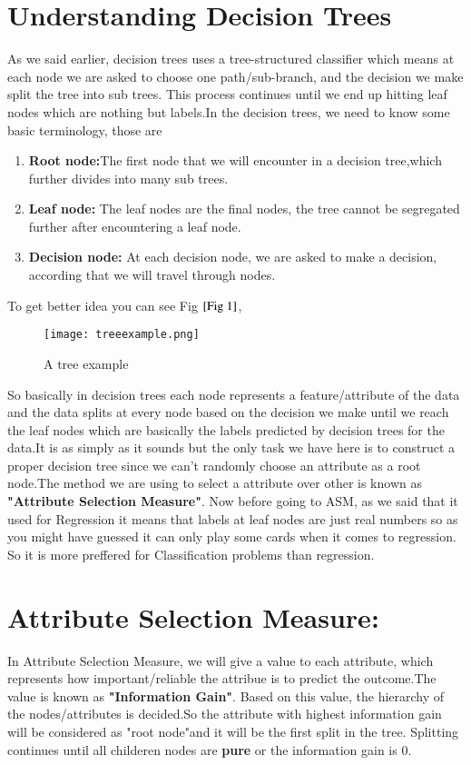 \documentclass[journal,12pt,onecolumn]{IEEEtran}
\theoremstyle{remark}
\numberwithin{equation}{section}
\begin{document}
                \section{Understanding Decision Trees}
                 As we said earlier, decision trees uses a tree-structured classifier which means at each node we are asked to choose one path/sub-branch, and the decision we make split the tree into sub trees. This process continues until we end up hitting leaf nodes which are nothing but labels.In the decision trees, we need to know some basic terminology, those are 
                \begin{enumerate}
                 \item \textbf{Root node:}The first node that we will encounter in a decision tree,which further divides into many sub trees.
                 \item \textbf{Leaf node:} The leaf nodes are the final nodes, the tree cannot be segregated further after encountering a leaf node.
                 \item \textbf{Decision node:} At each decision node, we are asked to make a decision, according that we will travel through nodes.    
                \end{enumerate}
     To get better idea you can see Fig $\ref{Fig 1}$,
           \begin{figure}
             \centering
             \texttt{[image: treeexample.png]}
             \caption{A tree example}
             \label{Fig 1}
           \end{figure}
     So basically in decision trees each node represents a feature/attribute of the data and the data splits at every node based on the decision we make until we reach the leaf nodes which are basically the labels predicted by decision trees for the data.It is as simply as it sounds but the only task we have here is to construct a proper decision tree since we can't randomly choose an attribute as a root node.The method we are using to select a attribute over other is known as \textbf{"Attribute Selection Measure"}. Now before going to ASM, as we said that it used for Regression it means that labels at leaf nodes are just real numbers so as you might have guessed it can only play some cards when it comes to regression. So it is more preffered for Classification problems than regression.
              \section{Attribute Selection Measure:}
          In Attribute Selection Measure, we will give a value to each attribute, which represents how important/reliable the attribue is to predict the outcome.The value is known as \textbf{"Information Gain"}. Based on this value, the hierarchy of the nodes/attributes is decided.So the attribute with highest information gain will be considered as "root node"and it will be the first split in the tree. Splitting continues until all childeren nodes are \textbf{pure} or the information gain is $0$.
\end{document}
